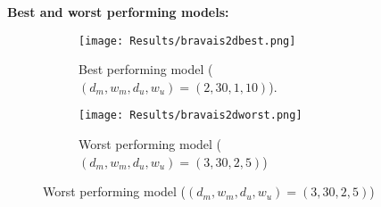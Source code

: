 \textbf{Best and worst performing models:}
\begin{figure}
    \centering
    \begin{subfigure}[t]{0.49\textwidth}
        \centering
        \texttt{[image: Results/bravais2dbest.png]}
        \caption{Best performing model ($(d_m,w_m,d_u,w_u)=(2, 30, 1, 10)$).}
    \end{subfigure}
    \hfill
    \begin{subfigure}[t]{0.49\textwidth}
        \centering
        \texttt{[image: Results/bravais2dworst.png]}
        \caption{Worst performing model ($(d_m,w_m,d_u,w_u)=(3, 30, 2, 5)$)}
    \end{subfigure}   
\end{figure}